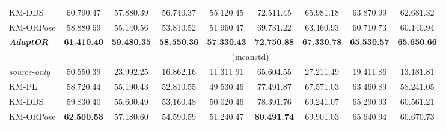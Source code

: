 \begin{table*}[t]
{\begin{tabular}{l|cccc|cccc}
			KM-DDS                   & 60.790.47                                                                                        & 57.880.39                                                  & 56.740.37          & 55.120.45          & 72.511.45          & 65.981.18          & 63.870.99          & 62.681.32 \Tstrut          \\
			KM-ORPose                & 58.880.69                                                                                        & 55.140.56                                                  & 53.810.52          & 51.960.47          & 69.731.22          & 63.460.93          & 60.710.73          & 60.140.94 \Tstrut          \\ \hline
			\emph{\textbf{AdaptOR}}  & \textbf{61.410.40}                                                                               & \textbf{59.480.35}                                         & \textbf{58.550.36} & \textbf{57.330.43} & \textbf{72.750.88} & \textbf{67.330.78} & \textbf{65.530.57} & \textbf{65.650.66} \Tstrut
			\\\hline
			                         & \multicolumn{8}{c}{ (meanstd)} \Tstrut \Bstrut                                                                                                                                                                                                                                                     \\
			\hline
			\emph{source-only}       & 50.550.39                                                                                        & 23.992.25                                                  & 16.862.16          & 11.311.91          & 65.604.55          & 27.211.49          & 19.411.86          & 13.181.81 \Tstrut          \\\hline
			KM-PL                    & 58.720.44                                                                                        & 55.190.43                                                  & 52.810.55          & 49.530.46          & 77.491.87          & 67.571.03          & 63.460.89          & 58.241.05 \Tstrut          \\
			KM-DDS                   & 59.830.40                                                                                        & 55.600.49                                                  & 53.160.48          & 50.020.46          & 78.391.76          & 69.241.07          & 65.290.93          & 60.561.21 \Tstrut          \\
			KM-ORPose                & \textbf{62.500.53}                                                                               & 57.180.60                                                  & 54.590.59          & 51.240.47          & \textbf{80.491.74} & 69.901.03          & 65.640.94          & 60.670.73 \Tstrut          \\ \hline

\end{tabular}}
\end{table*}

